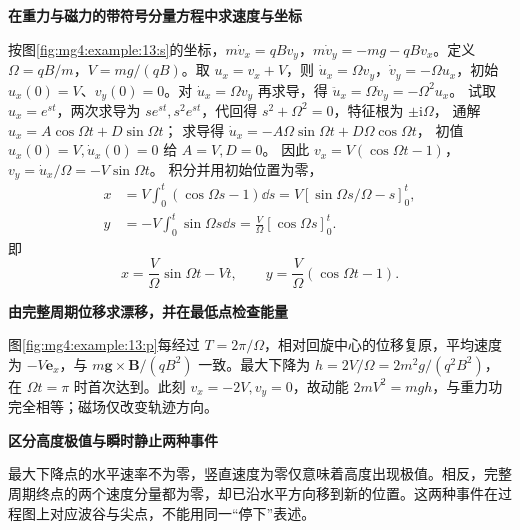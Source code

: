 \begin{solution}\textbf{在重力与磁力的带符号分量方程中求速度与坐标}\par\nobreak
按图\ref{fig:mg4:example:13:s}的坐标，$m\dot v_x=qBv_y$，$m\dot v_y=-mg-qBv_x$。定义 $\Omega=qB/m$，$V=mg/(qB)$。取 $u_x=v_x+V$，则 $\dot u_x=\Omega v_y$，$\dot v_y=-\Omega u_x$，初始 $u_x(0)=V$、$v_y(0)=0$。对 $\dot u_x=\Omega v_y$ 再求导，得
$\ddot u_x=\Omega\dot v_y=-\Omega^2u_x$。
试取 $u_x=e^{st}$，两次求导为 $se^{st},s^2e^{st}$，代回得
$s^2+\Omega^2=0$，特征根为 $\pm\mathrm i\Omega$，
通解 $u_x=A\cos\Omega t+D\sin\Omega t$；
求导得 $\dot u_x=-A\Omega\sin\Omega t+D\Omega\cos\Omega t$，
初值 $u_x(0)=V,\dot u_x(0)=0$ 给 $A=V,D=0$。
因此 $v_x=V(\cos\Omega t-1)$，
$v_y=\dot u_x/\Omega=-V\sin\Omega t$。
积分并用初始位置为零，
\begin{align*}
 x&=V\int_0^t(\cos\Omega s-1)\dd s
   =V[\sin\Omega s/\Omega-s]_0^t,\\
 y&=-V\int_0^t\sin\Omega s\dd s
   =\frac V\Omega[\cos\Omega s]_0^t.
\end{align*}
即
\[
x=\frac V\Omega\sin\Omega t-Vt,\qquad
y=\frac V\Omega(\cos\Omega t-1).
\]



\par\medskip{}\noindent\textbf{由完整周期位移求漂移，并在最低点检查能量}\par\nobreak
图\ref{fig:mg4:example:13:p}每经过 $T=2\pi/\Omega$，相对回旋中心的位移复原，平均速度为 $-V\bm e_x$，与 $m\bm g\times\bm B/(qB^2)$ 一致。最大下降为 $h=2V/\Omega=2m^2g/(q^2B^2)$，在 $\Omega t=\pi$ 时首次达到。此刻 $v_x=-2V,v_y=0$，故动能 $2mV^2=mgh$，与重力功完全相等；磁场仅改变轨迹方向。



\par\medskip{}\noindent\textbf{区分高度极值与瞬时静止两种事件}\par\nobreak
最大下降点的水平速率不为零，竖直速度为零仅意味着高度出现极值。相反，完整周期终点的两个速度分量都为零，却已沿水平方向移到新的位置。这两种事件在过程图上对应波谷与尖点，不能用同一“停下”表述。\end{solution}
